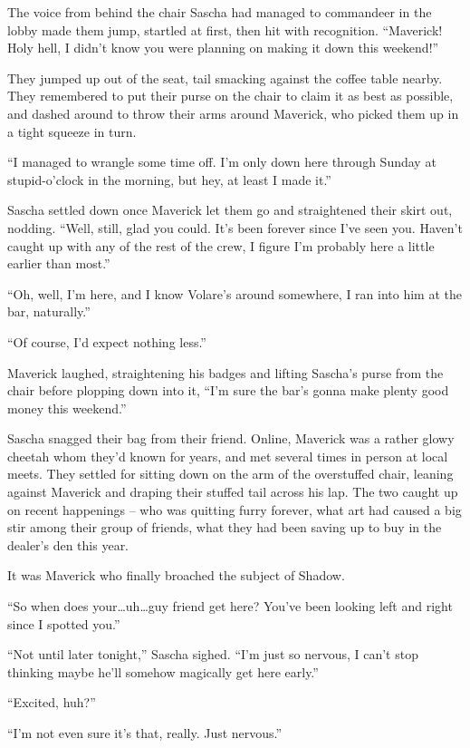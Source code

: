 The voice from behind the chair Sascha had managed to commandeer in the lobby made them jump, startled at first, then hit with recognition. ``Maverick! Holy hell, I didn't know you were planning on making it down this weekend!''

They jumped up out of the seat, tail smacking against the coffee table nearby.  They remembered to put their purse on the chair to claim it as best as possible, and dashed around to throw their arms around Maverick, who picked them up in a tight squeeze in turn.

``I managed to wrangle some time off. I'm only down here through Sunday at stupid-o'clock in the morning, but hey, at least I made it.''

Sascha settled down once Maverick let them go and straightened their skirt out, nodding. ``Well, still, glad you could. It's been forever since I've seen you. Haven't caught up with any of the rest of the crew, I figure I'm probably here a little earlier than most.''

``Oh, well, I'm here, and I know Volare's around somewhere, I ran into him at the bar, naturally.''

``Of course, I'd expect nothing less.''

Maverick laughed, straightening his badges and lifting Sascha's purse from the chair before plopping down into it, ``I'm sure the bar's gonna make plenty good money this weekend.''

Sascha snagged their bag from their friend. Online, Maverick was a rather glowy cheetah whom they'd known for years, and met several times in person at local meets. They settled for sitting down on the arm of the overstuffed chair, leaning against Maverick and draping their stuffed tail across his lap. The two caught up on recent happenings -- who was quitting furry forever, what art had caused a big stir among their group of friends, what they had been saving up to buy in the dealer's den this year.

It was Maverick who finally broached the subject of Shadow.

``So when does your\ldots{}uh\ldots{}guy friend get here? You've been looking left and right since I spotted you.''

``Not until later tonight,'' Sascha sighed. ``I'm just so nervous, I can't stop thinking maybe he'll somehow magically get here early.''

``Excited, huh?''

``I'm not even sure it's that, really. Just nervous.''

